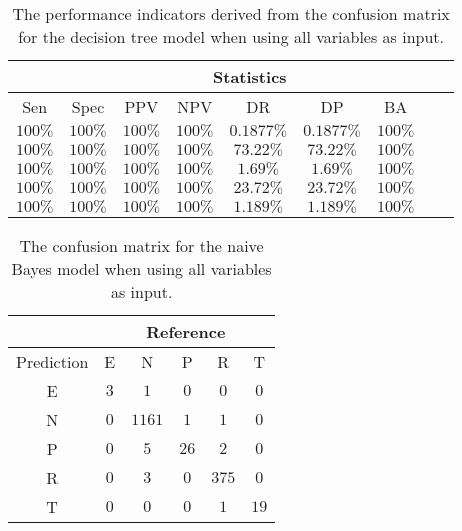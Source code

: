 \begin{table}[!ht]
	\centering
	\begin{tabular}{|c|c|c|c|c|c|c|c|c|}
		\hline
		 & \multicolumn{7}{c|}{Statistics} \\ \hline
		Sen & Spec & PPV & NPV & DR & DP & BA \\ \hline
		$100\%$ & $100\%$ & $100\%$ & $100\%$ & $0.1877\%$ & $0.1877\%$ & $100\%$ \\ \hline
		$100\%$ & $100\%$ & $100\%$ & $100\%$ & $73.22\%$ & $73.22\%$ & $100\%$ \\ \hline
		$100\%$ & $100\%$ & $100\%$ & $100\%$ & $1.69\%$ & $1.69\%$ & $100\%$ \\ \hline
		$100\%$ & $100\%$ & $100\%$ & $100\%$ & $23.72\%$ & $23.72\%$ & $100\%$ \\ \hline
		$100\%$ & $100\%$ & $100\%$ & $100\%$ & $1.189\%$ & $1.189\%$ & $100\%$ \\ \hline
	\end{tabular}
	\caption{The performance indicators derived from the confusion matrix for the decision tree model when using all variables as input.}
	\label{tab:cs:all:C5.0}
\end{table}

\begin{table}[!ht]
	\centering
	\begin{tabular}{|c|c|c|c|c|c|}
		\hline
		 & \multicolumn{5}{|c|}{Reference} \\ \hline
		 Prediction & E & N & P & R & T \\ \hline
		 E & $3$ & $1$ & $0$ & $0$ & $0$ \\ \hline
		 N & $0$ & $1161$ & $1$ & $1$ & $0$ \\ \hline
		 P & $0$ & $5$ & $26$ & $2$ & $0$ \\ \hline
		 R & $0$ & $3$ & $0$ & $375$ & $0$ \\ \hline
		 T & $0$ & $0$ & $0$ & $1$ & $19$ \\ \hline
	\end{tabular}
	\caption{The confusion matrix for the naive Bayes model when using all variables as input.}
	\label{tab:cm:all:nb}
\end{table}

